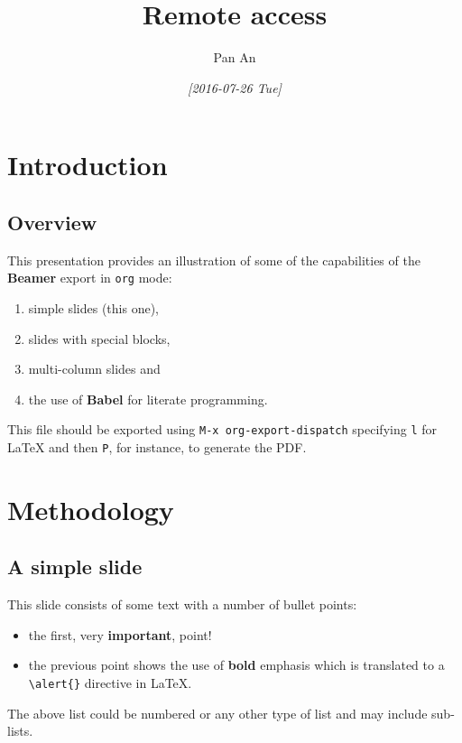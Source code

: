 \documentclass[bigger]{beamer}
\author{Pan An}
\date{\textit{[2016-07-26 Tue]}}
\title{Remote access}
\begin{document}
\maketitle
\tableofcontents


\section{Introduction}
\label{sec:orgheadline2}
\subsection{Overview}
\label{sec:orgheadline1}
This presentation provides an illustration of some of the capabilities of the \textbf{Beamer} export in \texttt{org} mode:

\begin{enumerate}
\item simple slides (this one),
\item slides with special blocks,
\item multi-column slides and
\item the use of \textbf{Babel} for literate programming.
\end{enumerate}

This file should be exported using \texttt{M-x org-export-dispatch} specifying \texttt{l} for \LaTeX{} and then \texttt{P}, for instance, to generate the PDF.

\section{Methodology}
\label{sec:orgheadline12}

\subsection{A simple slide}
\label{sec:orgheadline3}
This slide consists of some text with a number of bullet points:

\begin{itemize}
\item the first, very \textbf{important}, point!
\item the previous point shows the use of \textbf{bold} emphasis which is translated to a \texttt{\textbackslash{}alert\{\}} directive in \LaTeX.
\end{itemize}

The above list could be numbered or any other type of list and may include sub-lists.
\end{document}
